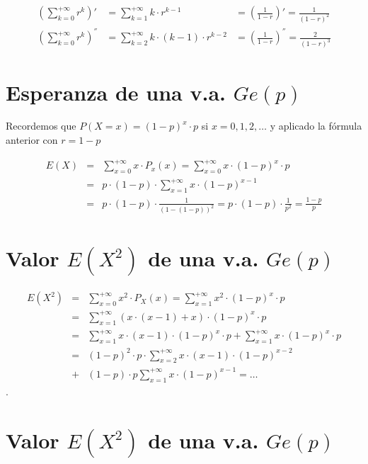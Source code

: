 \documentclass[
  letterpaper,
  DIV=11,
  numbers=noendperiod]{scrreprt}
\begin{document}
\[
\begin{array}{rlrl}
\left(\sum_{k=0}^{+\infty} r^k\right)'&= \sum_{k=1}^{+\infty}k\cdot
r^{k-1} &= \left(\frac1{1-r}\right)'=\frac1{(1-r)^2}\\
\left(\sum_{k=0}^{+\infty} r^k\right)^{''}&= \sum_{k=2}^{+\infty}k \cdot(k-1)\cdot
r^{k-2}&=\left(\frac1{1-r}\right)^{''}=\frac2{(1-r)^3}
\end{array}
\]

\section{\texorpdfstring{Esperanza de una v.a.
\(Ge(p)\)}{Esperanza de una v.a. Ge(p)}}\label{esperanza-de-una-v.a.-gep}

Recordemos que \(P(X=x)=(1-p)^x\cdot p\) si \(x=0,1,2,\ldots\) y
aplicado la fórmula anterior con \(r=1-p\)

\begin{eqnarray*}
E(X)&=&\sum_{x=0}^{+\infty} x\cdot P_x(x)=\sum_{x=0}^{+\infty} x\cdot (1-p)^x\cdot p\\
&=& p\cdot (1-p) \cdot \sum_{x=1}^{+\infty} x\cdot (1-p)^{x-1}\\
&=& p\cdot (1-p)\cdot \frac{1}{(1-(1-p))^2}=p\cdot (1-p)\cdot \frac{1}{p^2}=\frac{1-p}{p}
\end{eqnarray*}

\section{\texorpdfstring{Valor \(E(X^2)\) de una v.a.
\(Ge(p)\)}{Valor E(X\^{}2) de una v.a. Ge(p)}}\label{valor-ex2-de-una-v.a.-gep}

\begin{eqnarray*}
E(X^2)&=&\sum_{x=0}^{+\infty} x^2\cdot P_X(x)=\sum_{x=1}^{+\infty} x^2\cdot (1-p)^x\cdot p\\
&=& 
\sum_{x=1}^{+\infty} (x\cdot (x-1)+x)\cdot (1-p)^{x}\cdot p\\
&=&
\sum_{x=1}^{+\infty} x\cdot (x-1)\cdot (1-p)^{x}\cdot p+\sum_{x=1}^{+\infty} x \cdot (1-p)^{x}\cdot p\\
&=&
(1-p)^{2}\cdot p\cdot \sum_{x=2}^{+\infty} x\cdot (x-1)\cdot (1-p)^{x-2}\\ 
&  +&   (1-p)\cdot p\sum_{x=1}^{+\infty} x \cdot (1-p)^{x-1} = \ldots
\end{eqnarray*}.

\section{\texorpdfstring{Valor \(E(X^2)\) de una v.a.
\(Ge(p)\)}{Valor E(X\^{}2) de una v.a. Ge(p)}}\label{valor-ex2-de-una-v.a.-gep-1}
\end{document}
